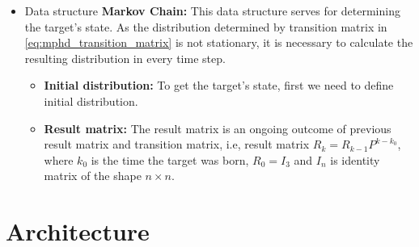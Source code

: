\begin{itemize}
\begin{itemize}
      \end{itemize}
  \item Data structure \textbf{Markov Chain:} This data structure serves for determining the target's state. As the
  distribution determined by transition matrix in \eqref{eq:mphd_transition_matrix} is not stationary, it is necessary
  to calculate the resulting distribution in every time step.
      \begin{itemize}
        \item \textbf{Initial distribution:} To get the target's state, first we need to define initial distribution.
        \item \textbf{Result matrix:} The result matrix is an ongoing outcome of previous result matrix and transition
        matrix, i.e, result matrix $R_k = R_{k-1} P^{k-k_0}$, where $k_0$ is the time the target was born,
        $R_0 = I_3$ and $I_n$ is identity matrix of the shape $n\times n$.
      \end{itemize}
\end{itemize}

\section{Architecture}
